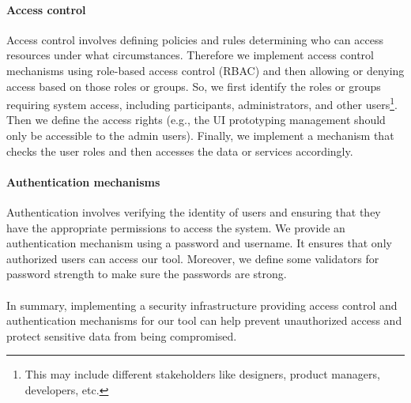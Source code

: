 \paragraph{Access control}
Access control involves defining policies and rules determining who can access resources under what circumstances.
Therefore we implement access control mechanisms using role-based access control (RBAC) and then allowing or denying access based on those roles or groups.
So, we first identify the roles or groups requiring system access, including participants, administrators, and other users\footnote{This may include different stakeholders like designers, product managers, developers, etc.}. 
Then we define the access rights (e.g., the UI prototyping management should only be accessible to the admin users).
Finally, we implement a mechanism that checks the user roles and then accesses the data or services accordingly. 

\paragraph{Authentication mechanisms}
Authentication involves verifying the identity of users and ensuring that they have the appropriate permissions to access the system.
We provide an authentication mechanism using a password and username. 
It ensures that only authorized users can access our tool.
Moreover, we define some validators for password strength to make sure the passwords are strong.\\\\
In summary, implementing a security infrastructure providing access control and authentication mechanisms for our tool can help prevent unauthorized access and protect sensitive data from being compromised.

\clearpage